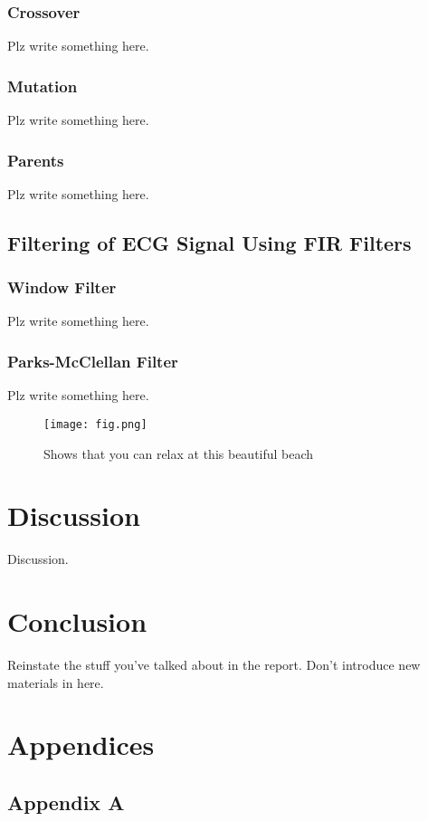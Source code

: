 \documentclass[a4paper, 11pt]{article}
\begin{document}
        \subsubsection{Crossover}
            Plz write something here.
        \subsubsection{Mutation}
            Plz write something here.
        \subsubsection{Parents}
            Plz write something here.
    \subsection{Filtering of ECG Signal Using FIR Filters}\label{sec:meth_sub5}
        \subsubsection{Window Filter}
            Plz write something here.
        \subsubsection{Parks-McClellan Filter}
            Plz write something here.
    
    \begin{figure}[h]
        \centering
        \graphicspath{{./wiki/}}
        \texttt{[image: fig.png]}
        \caption{Shows that you can relax at this beautiful beach}
        \label{Fig:my_label}
    \end{figure}

\section{Discussion}\label{sec:dis}
    Discussion.

\section{Conclusion}\label{sec:conc}
    Reinstate the stuff you've talked about in the report. Don't introduce new materials in here.

\pagebreak

\renewcommand{\bibname}{References}
\renewcommand{\bibsection}{\section{\bibname}}
\renewcommand{\cite}{\citep}

\pagebreak

\section{Appendices}
    \subsection{Appendix A}
\end{document}
